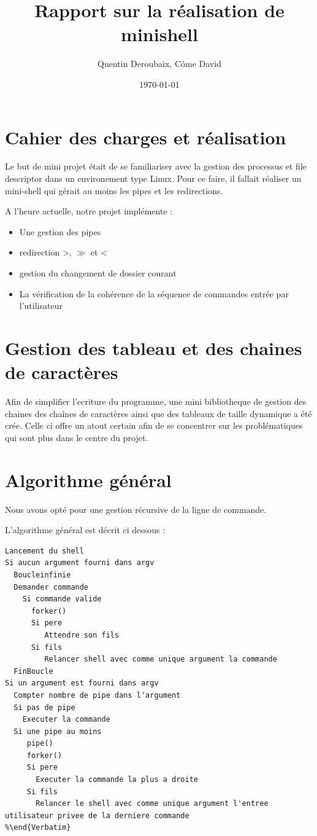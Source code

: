 \documentclass[fr]{article}
\begin{document}
\date{\today}

\title{Rapport sur la réalisation de minishell}
\author{Quentin Deroubaix, Côme David}
\maketitle

\section{Cahier des charges et réalisation}
Le but de mini projet était de se familiariser avec la gestion des
processus et file descriptor dans un environement type Linux. Pour ce
faire, il fallait réaliser un mini-shell qui gérait au moins les pipes
et les redirections.


A l'heure actuelle, notre projet implémente :

\begin{itemize}
\item Une gestion des pipes  
\item redirection >, $\gg$ et <
\item gestion du changement de dossier courant
\item La vérification de la cohérence de la séquence de commandes
  entrée par l'utilisateur
\end{itemize}

\section{Gestion des tableau et des chaines de caractères}
Afin de simplifier l'ecriture du programme, une mini bibliotheque de
gestion des chaines des chaînes de caractères ainsi que des tableaux
de taille dynamique a été crée. Celle ci offre un atout certain afin
de se concentrer sur les problématiques qui sont plus dans le centre
du projet.



\section{Algorithme général}
Nous avons opté pour une gestion récursive de la ligne de commande. 

L'algorithme général est décrit ci dessous : 
\begin{lstlisting}
Lancement du shell 
Si aucun argument fourni dans argv
  Boucleinfinie
  Demander commande
    Si commande valide
      forker() 
      Si pere 
         Attendre son fils
      Si fils 
         Relancer shell avec comme unique argument la commande
  FinBoucle
Si un argument est fourni dans argv
  Compter nombre de pipe dans l'argument
  Si pas de pipe
    Executer la commande
  Si une pipe au moins
     pipe()
     forker()
     Si pere
       Executer la commande la plus a droite
     Si fils
       Relancer le shell avec comme unique argument l'entree utilisateur privee de la derniere commande
%\end{Verbatim}
\end{lstlisting}
\end{document}

